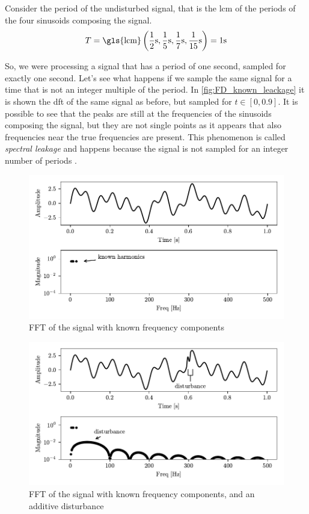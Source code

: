 Consider the period of the undisturbed signal, that is the \gls{lcm} of the periods of the four sinusoids composing the signal.
\[ 
    T = \text{\gls{lcm}} \left( \frac{1}{2} \si{\s},\frac{1}{5}\si{\s},\frac{1}{7}\si{\s},\frac{1}{15}\si{\s} \right) = 1 \si{\s}
\]

So, we were processing a signal that has a period of one second, sampled for exactly one second. Let's see what happens if we sample the same signal for a time that is not an integer multiple of the period. In \autoref{fig:FD_known_leackage} it is shown the \gls{dft} of the same signal as before, but sampled for $t \in [0, 0.9]$. It is possible to see that the peaks are still at the frequencies of the sinusoids composing the signal, but they are not single points as it appears that also frequencies near the true frequencies are present. This phenomenon is called \emph{spectral leakage} and happens because the signal is not sampled for an integer number of periods \cite{SpectralLeakage}. 


\begin{figure}
    \centering
    \includegraphics[width=\textwidth]{images/FeatureExtraction/FD_known.pdf}
    \caption{FFT of the signal with known frequency components}
    \label{fig:FD_known}
\end{figure}

\begin{figure}
    \centering
    \includegraphics[scale=1]{images/FeatureExtraction/FD_known_dist.pdf}
    \caption{FFT of the signal with known frequency components, and an additive disturbance}
    \label{fig:FD_known_dist}
\end{figure}

